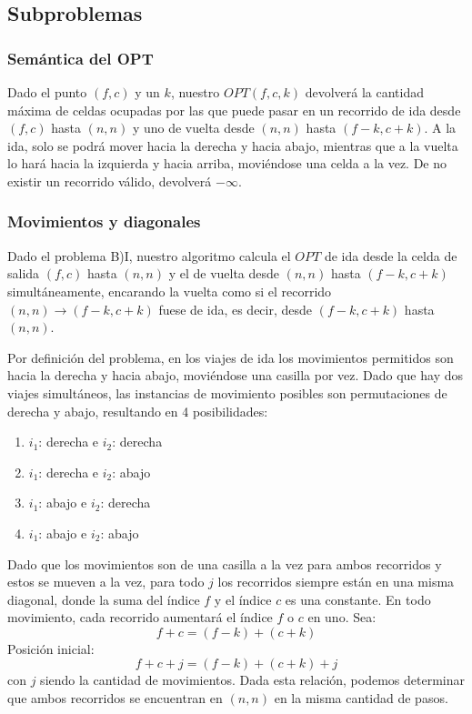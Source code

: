 \subsection{Subproblemas}

\subsubsection{Semántica del OPT}
Dado el punto $(f, c)$ y un $k$, nuestro $OPT(f, c, k)$ devolverá la cantidad máxima de celdas ocupadas por las que puede pasar en un recorrido de ida desde $(f, c)$
hasta $(n, n)$ y uno de vuelta desde $(n, n)$ hasta $(f - k, c + k)$. A la ida, solo se podrá mover hacia la derecha y hacia abajo, mientras que a la vuelta lo hará
hacia la izquierda y hacia arriba, moviéndose una celda a la vez.
De no existir un recorrido válido, devolverá $-\infty$.

\subsubsection{Movimientos y diagonales}
Dado el problema B)I, nuestro algoritmo calcula el $OPT$ de ida desde la celda de salida $(f, c)$ hasta $(n, n)$ y el de vuelta desde $(n, n)$ hasta $(f - k, c + k)$ simultáneamente,
encarando la vuelta como si el recorrido $(n, n) \to (f - k, c + k)$ fuese de ida, es decir, desde $(f - k, c + k)$ hasta $(n, n)$.

Por definición del problema, en los viajes de ida los movimientos permitidos son hacia la derecha y hacia abajo, moviéndose una casilla por vez. Dado que hay dos viajes simultáneos,
las instancias de movimiento posibles son permutaciones de derecha y abajo, resultando en 4 posibilidades:
\begin{enumerate}
	\item $i_1$: derecha e $i_2$: derecha
	\item $i_1$: derecha e $i_2$: abajo
	\item $i_1$: abajo e $i_2$: derecha
	\item $i_1$: abajo e $i_2$: abajo
\end{enumerate}

Dado que los movimientos son de una casilla a la vez para ambos recorridos y estos se mueven a la vez, para todo $j$ los recorridos siempre están en una misma diagonal,
donde la suma del índice $f$ y el índice $c$ es una constante. En todo movimiento, cada recorrido aumentará el índice $f$ o $c$ en uno. Sea:
\[
	f + c = (f - k) + (c + k)
\]
Posición inicial:
\[
	f + c + j = (f - k) + (c + k) + j
\]
con $j$ siendo la cantidad de movimientos. Dada esta relación, podemos determinar que ambos recorridos se encuentran en $(n, n)$ en la misma cantidad de pasos.

